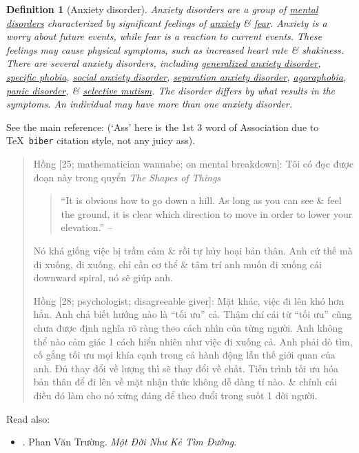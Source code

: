 \documentclass[12pt,twoside]{book}
\newtheorem{definition}{Definition}[section]
\begin{document}
\begin{definition}[Anxiety disorder]
	\emph{Anxiety disorders} are a group of \href{https://en.wikipedia.org/wiki/Mental_disorder}{mental disorders} characterized by significant feelings of \href{https://en.wikipedia.org/wiki/Anxiety_(mood)}{anxiety} \& \href{https://en.wikipedia.org/wiki/Fear}{fear}. Anxiety is a worry about future events, while fear is a reaction to current events. These feelings may cause physical symptoms, such as increased heart rate \& shakiness. There are several anxiety disorders, including \href{https://en.wikipedia.org/wiki/Generalized_anxiety_disorder}{generalized anxiety disorder}, \href{https://en.wikipedia.org/wiki/Specific_phobia}{specific phobia}, \href{https://en.wikipedia.org/wiki/Social_anxiety_disorder}{social anxiety disorder}, \href{https://en.wikipedia.org/wiki/Separation_anxiety_disorder}{separation anxiety disorder}, \href{https://en.wikipedia.org/wiki/Agoraphobia}{agoraphobia}, \href{https://en.wikipedia.org/wiki/Panic_disorder}{panic disorder}, \& \href{https://en.wikipedia.org/wiki/Selective_mutism}{selective mutism}. The disorder differs by what results in the symptoms. An individual may have more than one anxiety disorder.
\end{definition}
See the main reference: \cite{APA_DSM5} (`Ass' here is the 1st 3 word of Association due to \TeX\ {\tt biber} citation style, not any juicy ass).

\begin{quote}
	{\sf Hồng [25; mathematician wannabe; on mental breakdown]}: Tôi có đọc được đoạn này trong quyển {\it The Shapes of Things}
	\begin{quotation}
		``It is obvious how to go down a hill. As long as you can see \& feel the ground, it is clear which direction to move in order to lower your elevation.'' -- \cite[Sect. 1.2.3: {\it Sequentil Optimization of Shape, Which Way Is Down?}, p. 2]{Walker2015}
	\end{quotation}
	Nó khá giống việc bị trầm cảm \& rồi tự hủy hoại bản thân. Anh cứ thế mà đi xuống, đi xuống, chỉ cần cơ thể \& tâm trí anh muốn đi xuống cái downward spiral, nó sẽ giúp anh.
	
	{\sf Hồng [28; psychologist; disagreeable giver]}: Mặt khác, việc đi lên khó hơn hẳn. Anh chả biết hướng nào là ``tối ưu'' cả. Thậm chí cái từ ``tối ưu'' cũng chưa được định nghĩa rõ ràng theo cách nhìn của từng người. Anh không thể nào cảm giác 1 cách hiển nhiên như việc đi xuống cả. Anh phải dò tìm, cố gắng tối ưu mọi khía cạnh trong cả hành động lẫn thế giới quan của anh. Đủ thay đổi về lượng thì sẽ thay đổi về chất. Tiến trình tối ưu hóa bản thân để đi lên về mặt nhận thức không dễ dàng tí nào. \& chính cái điều đó làm cho nó xứng đáng để theo đuổi trong suốt 1 đời người.
\end{quote}
Read also:
\begin{itemize}
	\item \cite{Truong_ke_tim_duong}. {\sc Phan Văn Trường}. {\it Một Đời Như Kẻ Tìm Đường}.
\end{itemize}
\end{document}
